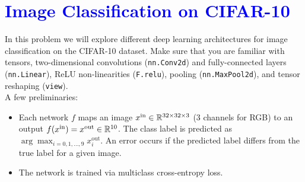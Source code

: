 \documentclass{article}
\begin{document}
\clearpage
\section*{\textcolor{blue}{Image Classification on CIFAR-10}}
\begin{bprob} In this problem we will explore different deep learning architectures for image classification on the CIFAR-10 dataset. Make sure that you are familiar with tensors, two-dimensional convolutions (\texttt{nn.Conv2d}) and fully-connected layers (\texttt{nn.Linear}), ReLU non-linearities (\texttt{F.relu}), pooling (\texttt{nn.MaxPool2d}), and tensor reshaping (\texttt{view}). \\

A few preliminaries:
\begin{itemize}
  \item Each network $f$ maps an image $x^\text{in} \in \mathbb{R}^{32 \times 32 \times 3}$ (3 channels for RGB) to an output $f(x^\text{in}) = x^\text{out} \in \mathbb{R}^{10}$. The class label is predicted as $\arg\max_{i=0,1,\dots,9} x_{i}^\text{out}$. An error occurs if the predicted label differs from the true label for a given image. 
  \item The network is trained via multiclass cross-entropy loss. %
 

\end{itemize}
\end{bprob}
\end{document}
